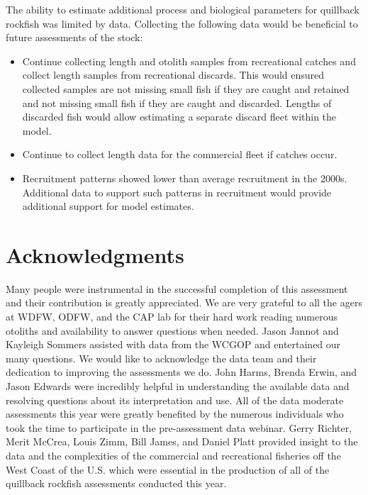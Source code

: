 \documentclass[11pt,
  english,
  a4paper,
]{article}
\begin{document}
\leavevmode\tagmcend\tagstructend


The ability to estimate additional process and biological parameters for quillback rockfish was limited by data. Collecting the following data would be beneficial to future assessments of the stock:

\leavevmode\tagmcend\tagstructend\par

\begin{itemize}

    \item Continue collecting length and otolith samples from recreational catches and collect length samples from recreational discards. This would ensured collected samples are not missing small fish if they are caught and retained and not missing small fish if they are caught and discarded. Lengths of discarded fish would allow estimating a separate discard fleet within the model.   

    \item Continue to collect length data for the commercial fleet if catches occur.
    
    \item Recruitment patterns showed lower than average recruitment in the 2000s. Additional data to support such patterns in recruitment would provide additional support for model estimates.  

\end{itemize}


\hypertarget{acknowledgments}{%
\section{Acknowledgments}\label{acknowledgments}}

\leavevmode\tagmcend\tagstructend


Many people were instrumental in the successful completion of this assessment and their contribution is greatly appreciated. We are very grateful to all the agers at WDFW, ODFW, and the CAP lab for their hard work reading numerous otoliths and availability to answer questions when needed. Jason Jannot and Kayleigh Sommers assisted with data from the WCGOP and entertained our many questions. We would like to acknowledge the data team and their dedication to improving the assessments we do. John Harms, Brenda Erwin, and Jason Edwards were incredibly helpful in understanding the available data and resolving questions about its interpretation and use. All of the data moderate assessments this year were greatly benefited by the numerous individuals who took the time to participate in the pre-assessment data webinar. Gerry Richter, Merit McCrea, Louis Zimm, Bill James, and Daniel Platt provided insight to the data and the complexities of the commercial and recreational fisheries off the West Coast of the U.S. which were essential in the production of all of the quillback rockfish assessments conducted this year.
\end{document}
